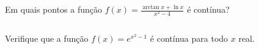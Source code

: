\begin{frame}
  \begin{columns}[onlytextwidth]
    \begin{column}{0.7\textwidth}\vspace{-0.5cm}
      \begin{example}
        Em quais pontos a função $\displaystyle f(x) = \frac{\arctan{x} + \ln{x}}{x^{2}-4}$ é contínua?
      \end{example}
    \end{column}
    \begin{column}{0.3\textwidth}\vspace{-0.5cm}
    \end{column}
  \end{columns}
\end{frame}

\begin{frame}
  \begin{columns}[onlytextwidth]
    \begin{column}{0.7\textwidth}\vspace{-0.5cm}
      \begin{example}
        Verifique que a função $\displaystyle f(x) = e^{x^{2}-1}$ é contínua para todo $x$ real.
      \end{example}
    \end{column}
    \begin{column}{0.3\textwidth}\vspace{-0.5cm}
    \end{column}
  \end{columns}
\end{frame}

